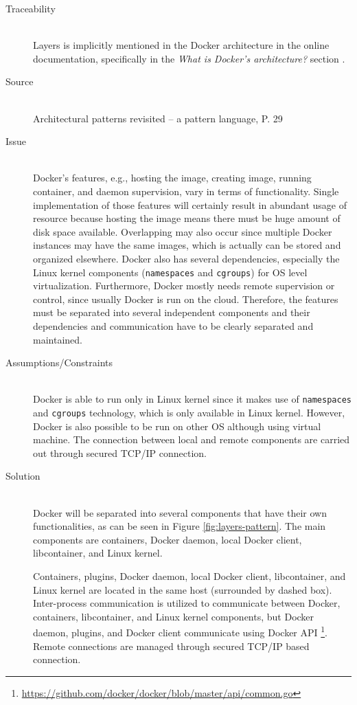 \begin{description}
\item [Traceability]~\\
Layers is implicitly mentioned in the Docker architecture in the online
documentation, specifically in the \textit{What is Docker’s architecture?}
section \cite{dockerarchi}.

\item [Source]~\\
Architectural patterns revisited -- a pattern language, P. 29
\cite{avgeriou2005architectural}

\item [Issue]~\\
Docker's features, e.g., hosting the image, creating image, running container,
and daemon supervision, vary in terms of functionality. Single
implementation of those features will certainly result in abundant usage of
resource because hosting the image means there must be huge amount of disk space
available. Overlapping may also occur since multiple Docker instances may have
the same images, which is actually can be stored and organized elsewhere. Docker
also has several dependencies, especially the Linux kernel components
(\texttt{namespaces} and \texttt{cgroups}) for OS level virtualization.
Furthermore, Docker mostly needs remote supervision or control, since usually
Docker is run on the cloud. Therefore, the features must be separated into
several independent components and their dependencies and communication have to
be clearly separated and maintained.

\item [Assumptions/Constraints]~\\
Docker is able to run only in Linux kernel since it makes use of
\texttt{namespaces} and \texttt{cgroups} technology, which is only available in
Linux kernel. However, Docker is also possible to be run on other OS
although using virtual machine. The connection between local and remote
components are carried out through secured TCP/IP connection.

\item [Solution]~\\
Docker will be separated into several components that have their own
functionalities, as can be seen in Figure \ref{fig:layers-pattern}. The main
components are containers, Docker daemon, local Docker client, libcontainer, and
Linux kernel.

Containers, plugins, Docker daemon, local Docker client, libcontainer, and Linux
kernel are located in the same host (surrounded by dashed box). Inter-process
communication is utilized to communicate between Docker, containers,
libcontainer, and Linux kernel components, but Docker daemon, plugins, and
Docker client communicate using Docker API
\footnote{\url{https://github.com/docker/docker/blob/master/api/common.go}}.
Remote connections are managed through secured TCP/IP based connection.



\end{description}
